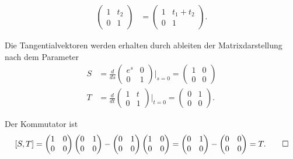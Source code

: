 \begin{loesung}
\begin{teilaufgaben}
\begin{align*}
\begin{pmatrix} 1&t_2\\0&1\end{pmatrix}
&=
\begin{pmatrix} 1&t_1+t_2\\0&1\end{pmatrix}.
\end{align*}
\item
Die Tangentialvektoren werden erhalten durch ableiten der
Matrixdarstellung nach dem Parameter
\begin{align*}
S
&=
\frac{d}{ds} \begin{pmatrix}e^s&0\\0&1\end{pmatrix}\bigg|_{s=0}
=
\begin{pmatrix}1&0\\0&0\end{pmatrix}
\\
T
&=
\frac{d}{dt} \begin{pmatrix}1&t\\0&1\end{pmatrix}\bigg|_{t=0}
=
\begin{pmatrix}0&1\\0&0\end{pmatrix}.
\end{align*}
\item Der Kommutator ist
\[
[S,T]
=
\begin{pmatrix}1&0\\0&0\end{pmatrix}
\begin{pmatrix}0&1\\0&0\end{pmatrix}
-
\begin{pmatrix}0&1\\0&0\end{pmatrix}
\begin{pmatrix}1&0\\0&0\end{pmatrix}
=
\begin{pmatrix}0&1\\0&0\end{pmatrix}
-
\begin{pmatrix}0&0\\0&0\end{pmatrix}
=
T.
\qedhere
\]
\end{teilaufgaben}
\end{loesung}

